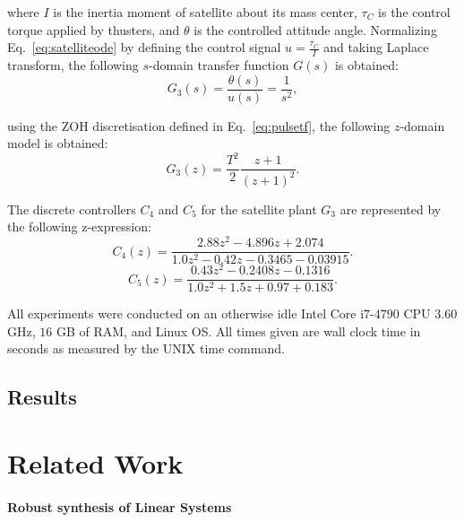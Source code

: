\documentclass{sig-alternate-05-2015}
\begin{document}
\noindent where $I$ is the inertia moment of satellite about its mass center, $\tau_{C}$ is the control 
torque applied by thusters, and $\theta$ is the controlled attitude angle. 
Normalizing Eq.~\eqref{eq:satelliteode} by defining the control signal $u=\frac{\tau_{C}}{I}$ and 
taking Laplace transform, the following $s$-domain transfer function $G(s)$ is obtained:
%
\begin{equation}
\label{eq:satellitetf}
G_{3}(s)=\frac{\theta(s)}{u(s)}=\frac{1}{s^2},
\end{equation}

\noindent using the ZOH discretisation defined in Eq.~\eqref{eq:pulsetf}, 
the following $z$-domain model is obtained:
\begin{equation}
G_{3}(z)= \frac{T^{2}}{2} \frac{z+1}{(z+1)^{2}}.
\end{equation}

The discrete controllers $C_{4}$ and $C_{5}$ for the satellite plant $G_{3}$ 
are represented by the following z-expression:
%
\begin{equation}
\label{satellite-b2}
C_{4}(z)=\frac{2.88z^2 - 4.896z + 2.074}{1.0z^2 - 0.42z - 0.3465 - 0.03915}. \nonumber
\end{equation} 
%
\begin{equation}
\label{satellite-c2}
C_{5}(z)=\frac{0.43z^2 - 0.2408z - 0.1316}{1.0z^2 + 1.5z + 0.97 + 0.183}. \nonumber
\end{equation} 


All experiments were conducted on an otherwise idle Intel Core i$7$-$4790$ 
CPU $3$.$60$ GHz, $16$ GB of RAM, and Linux OS.  All times given are wall 
clock time in seconds as measured by the UNIX time command.

\subsection{Results}
\label{experimental-results}

\section{Related Work}

\paragraph{Robust synthesis of Linear Systems} 
\end{document}
